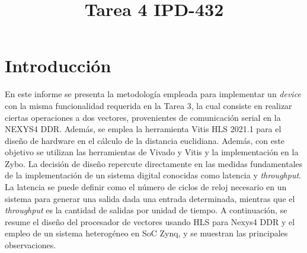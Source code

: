 \documentclass[conference]{IEEEtran}
\begin{document}
\title{Tarea 4 IPD-432\\
{%
}
}

\author{
\and
{}
}
\maketitle
\section{Introducción}
En este informe se presenta  la metodología empleada para implementar un \textit{device} con la misma funcionalidad requerida en la Tarea 3, la cual consiste en realizar ciertas operaciones a dos vectores, provenientes de comunicación serial en la NEXYS4 DDR. Además, se emplea la herramienta Vitis HLS 2021.1 para el diseño de hardware  en el cálculo  de la distancia euclidiana. Además, con este objetivo se utilizan las herramientas de Vivado y Vitis y la implementación en la Zybo.  La decisión de diseño repercute directamente  en las medidas fundamentales de la implementación de un sistema digital conocidas como latencia y \textit{throughput}. La latencia se puede definir como el número de ciclos de reloj necesario en un sistema para generar una salida dada una entrada determinada, mientras que el \textit{throughput} es la cantidad de salidas  por unidad de tiempo.   A continuación, se resume el diseño del procesador de vectores usando HLS para Nexys4 DDR y el empleo de un sistema heterogéneo en SoC Zynq, y se muestran  las principales observaciones.\par
\end{document}
